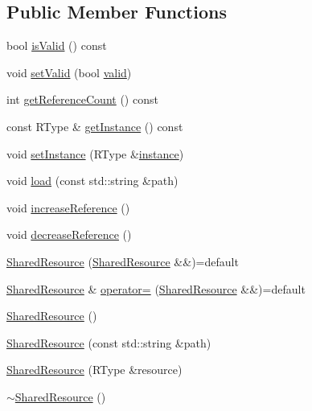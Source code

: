 \subsection*{Public Member Functions}
\begin{DoxyCompactItemize}
\item 
bool \hyperlink{classZeta_1_1SharedResource_a837ee944ca089fcc1f54b9d4e0b530b3}{is\+Valid} () const 
\item 
void \hyperlink{classZeta_1_1SharedResource_abbb89843eff487a6f0ecbee8d51b3757}{set\+Valid} (bool \hyperlink{classZeta_1_1SharedResource_aeff02cb931824d567b4f028b733e5ca1}{valid})
\item 
int \hyperlink{classZeta_1_1SharedResource_a1fab8bb2ccbc553972f9e49521350e89}{get\+Reference\+Count} () const 
\item 
const R\+Type \& \hyperlink{classZeta_1_1SharedResource_aa3d4ba5410d77a977ed73121a42eee70}{get\+Instance} () const 
\item 
void \hyperlink{classZeta_1_1SharedResource_a6c45e851cf2be63af170006a465591ff}{set\+Instance} (R\+Type \&\hyperlink{classZeta_1_1SharedResource_ac9580c623e0c67cdcc4dadb34ceebba1}{instance})
\item 
void \hyperlink{classZeta_1_1SharedResource_ad1e168b140359bfb79be98f81af9e19e}{load} (const std\+::string \&path)
\item 
void \hyperlink{classZeta_1_1SharedResource_a3a507e4daffff077d81ec1af71416f2c}{increase\+Reference} ()
\item 
void \hyperlink{classZeta_1_1SharedResource_aaa8146213f4022f067771c8f8f70f6e6}{decrease\+Reference} ()
\item 
\hyperlink{classZeta_1_1SharedResource_a13a4823827c762e18f68f8657a42746f}{Shared\+Resource} (\hyperlink{classZeta_1_1SharedResource}{Shared\+Resource} \&\&)=default
\item 
\hyperlink{classZeta_1_1SharedResource}{Shared\+Resource} \& \hyperlink{classZeta_1_1SharedResource_a841fab36c8d3b60361638cf4578c5f31}{operator=} (\hyperlink{classZeta_1_1SharedResource}{Shared\+Resource} \&\&)=default
\item 
\hyperlink{classZeta_1_1SharedResource_a3bc6e1f0b56cb87f4d34a488837c4a57}{Shared\+Resource} ()
\item 
\hyperlink{classZeta_1_1SharedResource_a28156681bc57e72d57cb8018d69bcfbf}{Shared\+Resource} (const std\+::string \&path)
\item 
\hyperlink{classZeta_1_1SharedResource_abe5814bd29124d389cfd8e7c908eada0}{Shared\+Resource} (R\+Type \&resource)
\item 
\hyperlink{classZeta_1_1SharedResource_ae37184e14dc3a0ea75ea1c1cca2fcbfc}{$\sim$\+Shared\+Resource} ()
\end{DoxyCompactItemize}

